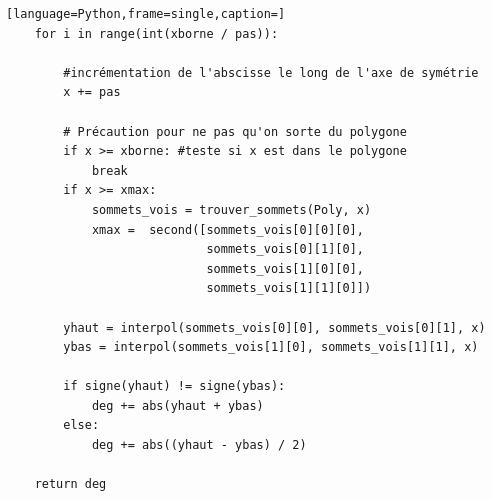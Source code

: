 \documentclass[a4paper,reqno]{article}
\begin{document}
\begin{lstlisting}[language=Python,frame=single,caption=]
    for i in range(int(xborne / pas)):

        #incrémentation de l'abscisse le long de l'axe de symétrie
        x += pas

        # Précaution pour ne pas qu'on sorte du polygone
        if x >= xborne: #teste si x est dans le polygone
            break
        if x >= xmax:
            sommets_vois = trouver_sommets(Poly, x)
            xmax =  second([sommets_vois[0][0][0],
                            sommets_vois[0][1][0],
                            sommets_vois[1][0][0],
                            sommets_vois[1][1][0]])

        yhaut = interpol(sommets_vois[0][0], sommets_vois[0][1], x)
        ybas = interpol(sommets_vois[1][0], sommets_vois[1][1], x)

        if signe(yhaut) != signe(ybas):
            deg += abs(yhaut + ybas)
        else:
            deg += abs((yhaut - ybas) / 2)
            
    return deg


\end{lstlisting}
\end{document}
